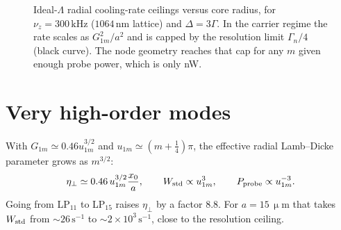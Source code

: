 \documentclass[11pt,a4paper]{article}
\newcommand{\micrometre}{\upmu m}\newcommand{\microkelvin}{\upmu K}
\newcommand{\SI}[2]{\ensuremath{#1\,\mathrm{#2}}}
\newcommand{\si}[1]{\ensuremath{\mathrm{#1}}}
\newcommand{\etaeff}{\eta_{\perp}}
\begin{document}
\begin{figure}[t]
\centering
{}
\caption{Ideal-$\Lambda$ radial cooling-rate ceilings versus core radius, for $\nu_z=\SI{300}{kHz}$ (\SI{1064}{nm} lattice) and $\Delta=3\Gamma$. In the carrier regime the rate scales as $G_{1m}^2/a^2$ and is capped by the resolution limit $\Gamma_n/4$ (black curve). The node geometry reaches that cap for any $m$ given enough probe power, which is only nW.}
\label{fig:trend}
\end{figure}

\section{Very high-order modes}
\label{sec:hom}
With $G_{1m}\simeq0.46u_{1m}^{3/2}$ and $u_{1m}\simeq(m+\tfrac14)\pi$, the effective radial Lamb--Dicke parameter grows as $m^{3/2}$:
\begin{equation}
  \etaeff\simeq0.46\,u_{1m}^{3/2}\frac{x_0}{a},\qquad
  W_{\rm std}\propto u_{1m}^3,\qquad P_{\rm probe}\propto u_{1m}^{-3}.
\end{equation}
Going from LP$_{11}$ to LP$_{15}$ raises $\etaeff$ by a factor 8.8. For $a=\SI{15}{\micrometre}$ that takes $W_{\rm std}$ from $\sim\SI{26}{s^{-1}}$ to $\sim\SI{2\times10^{3}}{s^{-1}}$, close to the resolution ceiling.
\end{document}
